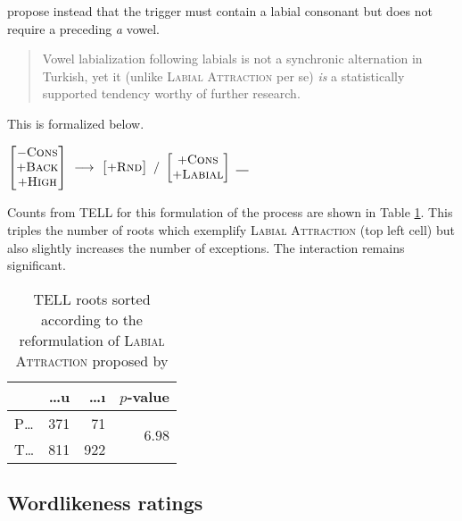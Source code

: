 \noindent
\citet[196]{Inkelas2001} propose instead that the trigger must contain a labial consonant but does not require a preceding \emph{a} vowel.

\begin{quote}
Vowel labialization following labials is not a synchronic alternation in Turkish, yet it (unlike \textsc{Labial Attraction} per se) \emph{is} a statistically supported tendency worthy of further research. \citep[][196]{Inkelas2001}
\end{quote}

\noindent
This is formalized below.

\begin{example}
$\begin{bmatrix} -\textsc{Cons} \\ +\textsc{Back} \\ +\textsc{High} \end{bmatrix}~\goesto~\begin{bmatrix} +\textsc{Rnd} \end{bmatrix}~/~\begin{bmatrix} +\textsc{Cons} \\ +\textsc{Labial} \end{bmatrix}~\gap{}$
\end{example}

Counts from TELL for this formulation of the process are shown in Table \ref{lasi}. This triples the number of roots which exemplify \textsc{Labial Attraction} (top left cell) but also slightly increases the number of exceptions. The interaction remains significant.

\begin{table}
\centering
\begin{tabular}{lrrr}
\toprule
       & \ldots{}u  & \ldots{}ı & $p$-value                      \\
\midrule
P\ldots{}  & 371    & 71        & \multirow{2}{*}{$6.98$\e{-49}} \\
T\ldots{}  & 811    & 922       &                                \\
\bottomrule
\end{tabular}
\caption{TELL roots sorted according to the reformulation of \textsc{Labial Attraction} proposed by \citet{Inkelas2001}}
\label{lasi}
\end{table}

\subsection{Wordlikeness ratings}

